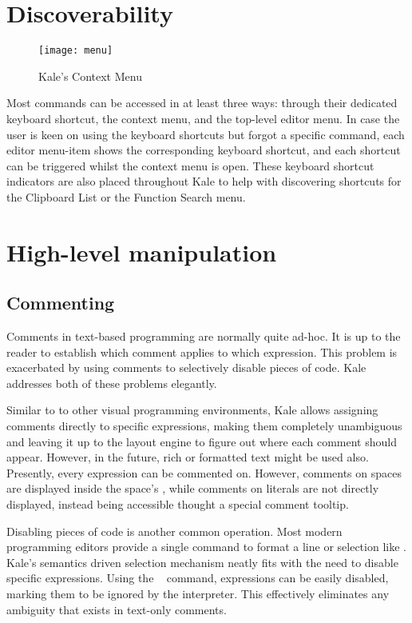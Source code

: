 \needspace{8cm}
\section{Discoverability}
\begin{wrapfigure}[21]{r}{5.5cm}
\texttt{[image: menu]}
\caption{Kale's Context Menu}
\end{wrapfigure}
Most commands can be accessed in at least three ways: through their dedicated
keyboard shortcut, the context menu, and the top-level editor menu. In case the
user is keen on using the keyboard shortcuts but forgot a specific command,
each editor menu-item shows the corresponding keyboard shortcut, and each
shortcut can be triggered whilst the context menu is open. These keyboard
shortcut indicators are also placed throughout Kale to help with discovering
shortcuts for the Clipboard List or the Function Search menu.




\section{High-level manipulation}

\subsection{Commenting}
Comments in text-based programming are normally quite ad-hoc. It is up to the
reader to establish which comment applies to which expression. This problem
is exacerbated by using comments to selectively disable pieces of code. Kale
addresses both of these problems elegantly.

Similar to to other visual
programming environments, Kale allows assigning comments directly to specific
expressions, making them completely unambiguous and leaving it up to the layout
engine to figure out where each comment should appear. However, in the future, rich or
formatted text might be used also. Presently, every expression can be commented on.
However, comments on spaces are displayed inside the space's , while
comments on literals are not directly displayed, instead being accessible
thought a special comment tooltip.

Disabling pieces of code is another common operation. Most modern programming
editors provide a single command to format a line or selection like
\keys{\ctrl + /}. Kale's semantics driven selection mechanism neatly fits with
the need to disable specific expressions. Using the
\hyperref[cmd:disable]{}~\keys{\textbackslash} command, expressions can
be easily disabled, marking them to be ignored by the interpreter. This effectively
eliminates any ambiguity that exists in text-only comments.

